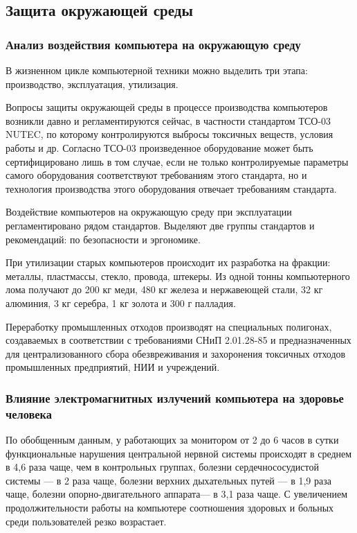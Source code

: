 \subsection{Защита окружающей среды}

\subsubsection{Анализ воздействия компьютера на окружающую среду}
В жизненном цикле компьютерной техники можно выделить три этапа: производство, эксплуатация, утилизация.

Вопросы защиты окружающей среды в процессе производства компьютеров возникли давно и регламентируются сейчас, в частности стандартом ТСО-03 NUTEC, по которому контролируются выбросы токсичных веществ, условия работы и др.
Согласно ТСО-03 произведенное оборудование может быть сертифицировано лишь в том случае, если не только контролируемые параметры самого оборудования соответствуют требованиям этого стандарта, но и технология производства этого оборудования отвечает требованиям стандарта.

Воздействие компьютеров на окружающую среду при эксплуатации регламентировано рядом стандартов.
Выделяют две группы стандартов и рекомендаций: по безопасности и эргономике.

При утилизации старых компьютеров происходит их разработка на фракции: металлы, пластмассы, стекло, провода, штекеры.
Из одной тонны компьютерного лома получают до 200 кг меди, 480 кг железа и нержавеющей стали, 32 кг алюминия, 3 кг серебра, 1 кг золота и 300 г палладия.

Переработку промышленных отходов производят на специальных полигонах, создаваемых в соответствии с требованиями СНиП 2.01.28-85 и предназначенных для централизованного сбора обезвреживания и захоронения токсичных отходов промышленных предприятий, НИИ и учреждений.

\subsubsection{Влияние электромагнитных излучений компьютера на здоровье человека}

По обобщенным данным, у работающих за монитором от 2 до 6 часов в сутки функциональные нарушения центральной нервной системы происходят в среднем в 4,6 раза чаще, чем в контрольных группах, болезни сердечнососудистой системы --- в 2 раза чаще, болезни верхних дыхательных путей --- в 1,9 раза чаще, болезни опорно-двигательного аппарата--- в 3,1 раза чаще.
С увеличением продолжительности работы на компьютере соотношения здоровых и больных среди пользователей резко возрастает.

